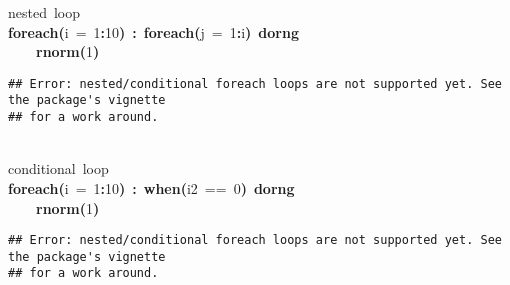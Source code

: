 \documentclass[a4paper,12pt]{article}\usepackage{graphicx, color}
\makeatletter
\newcommand{\hlnumber}[1]{\textcolor[rgb]{0,0,0}{#1}}%
\newcommand{\hlfunctioncall}[1]{\textcolor[rgb]{0.501960784313725,0,0.329411764705882}{\textbf{#1}}}%
\newcommand{\hlkeyword}[1]{\textcolor[rgb]{0,0,0}{\textbf{#1}}}%
\newcommand{\hlargument}[1]{\textcolor[rgb]{0.690196078431373,0.250980392156863,0.0196078431372549}{#1}}%
\newcommand{\hlcomment}[1]{\textcolor[rgb]{0.180392156862745,0.6,0.341176470588235}{#1}}%
\newcommand{\hlsymbol}[1]{\textcolor[rgb]{0,0,0}{#1}}%
\newcommand{\hlstd}[1]{\textcolor[rgb]{0,0,0}{#1}}%
\newenvironment{kframe}{%
 \def\FrameCommand##1{\hskip\@totalleftmargin \hskip-\fboxsep
 \colorbox{shadecolor}{##1}\hskip-\fboxsep
     \hskip-\linewidth \hskip-\@totalleftmargin \hskip\columnwidth}%
 \MakeFramed {\advance\hsize-\width
   \@totalleftmargin\z@ \linewidth\hsize
   \@setminipage}}%
 {\par\unskip\endMakeFramed}
\newenvironment{knitrout}{}{} %
\renewenvironment{knitrout}{\begin{footnotesize}}{\end{footnotesize}}
\makeatother
\begin{document}
\begin{knitrout}
\color{fgcolor}\begin{kframe}
\begin{flushleft}
\ttfamily\noindent
\hlcomment{\usebox{\hlnormalsizeboxhash}{\ }nested{\ }loop}\hspace*{\fill}\\
\hlstd{}\hlfunctioncall{foreach}\hlkeyword{(}\hlargument{i}{\ }\hlargument{=}{\ }\hlnumber{1}\hlkeyword{:}\hlnumber{10}\hlkeyword{)}{\ }\hlkeyword{\usebox{\hlnormalsizeboxpercent}:\usebox{\hlnormalsizeboxpercent}}{\ }\hlfunctioncall{foreach}\hlkeyword{(}\hlargument{j}{\ }\hlargument{=}{\ }\hlnumber{1}\hlkeyword{:}\hlsymbol{i}\hlkeyword{)}{\ }\hlkeyword{\usebox{\hlnormalsizeboxpercent}dorng\usebox{\hlnormalsizeboxpercent}}{\ }\hlkeyword{\usebox{\hlnormalsizeboxopenbrace}}\hspace*{\fill}\\
\hlstd{}{\ }{\ }{\ }{\ }\hlfunctioncall{rnorm}\hlkeyword{(}\hlnumber{1}\hlkeyword{)}\hspace*{\fill}\\
\hlstd{}\hlkeyword{\usebox{\hlnormalsizeboxclosebrace}}\mbox{}
\normalfont
\end{flushleft}
\begin{verbatim}
## Error: nested/conditional foreach loops are not supported yet. See the package's vignette
## for a work around.
\end{verbatim}
\begin{flushleft}
\ttfamily\noindent
\hspace*{\fill}\\
\hlstd{}\hlcomment{\usebox{\hlnormalsizeboxhash}{\ }conditional{\ }loop}\hspace*{\fill}\\
\hlstd{}\hlfunctioncall{foreach}\hlkeyword{(}\hlargument{i}{\ }\hlargument{=}{\ }\hlnumber{1}\hlkeyword{:}\hlnumber{10}\hlkeyword{)}{\ }\hlkeyword{\usebox{\hlnormalsizeboxpercent}:\usebox{\hlnormalsizeboxpercent}}{\ }\hlfunctioncall{when}\hlkeyword{(}\hlsymbol{i}\hlkeyword{\usebox{\hlnormalsizeboxpercent}\usebox{\hlnormalsizeboxpercent}}\hlnumber{2}{\ }=={\ }\hlnumber{0}\hlkeyword{)}{\ }\hlkeyword{\usebox{\hlnormalsizeboxpercent}dorng\usebox{\hlnormalsizeboxpercent}}{\ }\hlkeyword{\usebox{\hlnormalsizeboxopenbrace}}\hspace*{\fill}\\
\hlstd{}{\ }{\ }{\ }{\ }\hlfunctioncall{rnorm}\hlkeyword{(}\hlnumber{1}\hlkeyword{)}\hspace*{\fill}\\
\hlstd{}\hlkeyword{\usebox{\hlnormalsizeboxclosebrace}}\mbox{}
\normalfont
\end{flushleft}
\begin{verbatim}
## Error: nested/conditional foreach loops are not supported yet. See the package's vignette
## for a work around.
\end{verbatim}
\end{kframe}
\end{knitrout}
\end{document}

